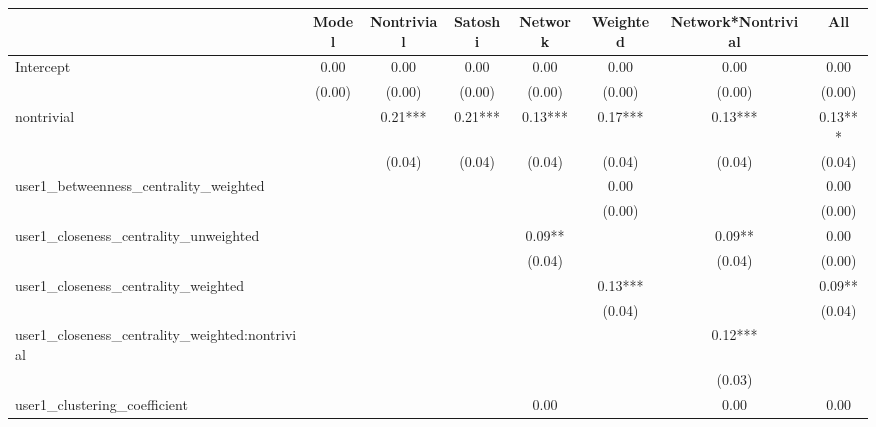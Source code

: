 \begin{table}
\caption{}
\begin{center}
\begin{tabular}{lccccccc}
\hline
                                               & Model    & Nontrivial & Satoshi & Network & Weighted & Network*Nontrivial &   All    \\
\hline
\hline

Intercept                                      & 0.00     & 0.00       & 0.00    & 0.00    & 0.00     & 0.00               & 0.00     \\
                                               & (0.00)   & (0.00)     & (0.00)  & (0.00)  & (0.00)   & (0.00)             & (0.00)   \\
nontrivial                                     &          & 0.21***    & 0.21*** & 0.13*** & 0.17***  & 0.13***            & 0.13***  \\
                                               &          & (0.04)     & (0.04)  & (0.04)  & (0.04)   & (0.04)             & (0.04)   \\
user1_betweenness_centrality_weighted          &          &            &         &         & 0.00     &                    & 0.00     \\
                                               &          &            &         &         & (0.00)   &                    & (0.00)   \\
user1_closeness_centrality_unweighted          &          &            &         & 0.09**  &          & 0.09**             & 0.00     \\
                                               &          &            &         & (0.04)  &          & (0.04)             & (0.00)   \\
user1_closeness_centrality_weighted            &          &            &         &         & 0.13***  &                    & 0.09**   \\
                                               &          &            &         &         & (0.04)   &                    & (0.04)   \\
user1_closeness_centrality_weighted:nontrivial &          &            &         &         &          & 0.12***            &          \\
                                               &          &            &         &         &          & (0.03)             &          \\
user1_clustering_coefficient                   &          &            &         & 0.00    &          & 0.00               & 0.00     \\

\end{tabular}
\end{center}
\end{table}
